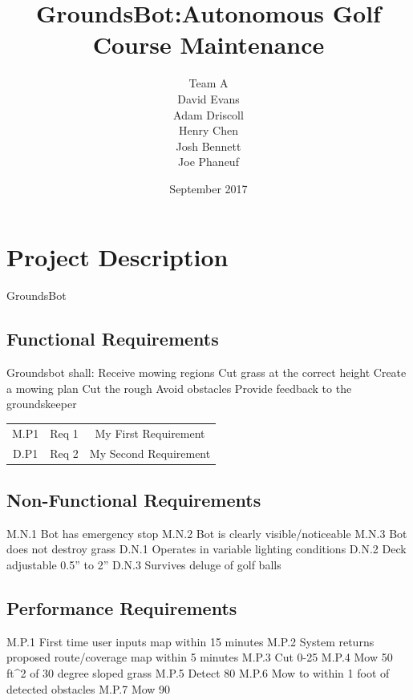 \documentclass{article}
\begin{document}
\title{GroundsBot:Autonomous Golf Course Maintenance}
\date{September 2017}
\author{Team A        \\ David Evans \\
        Adam Driscoll \\ Henry Chen  \\
        Josh Bennett  \\ Joe Phaneuf \\ }
\maketitle
\newpage

\tableofcontents
\newpage

\section{Project Description}
GroundsBot \\
\subsection{Functional Requirements}
Groundsbot shall:
  Receive mowing regions
  Cut grass at the correct height
  Create a mowing plan
  Cut the rough 
  Avoid obstacles
  Provide feedback to the groundskeeper
\begin{center}
\begin{tabular}{ |c|c|c| }
  \hline
    M.P1 & Req 1 & My First Requirement \\
    D.P1 & Req 2 & My Second Requirement \\
  \hline
\end{tabular}
\end{center}

\subsection{Non-Functional Requirements}
M.N.1 Bot has emergency stop
M.N.2 Bot is clearly visible/noticeable
M.N.3 Bot does not destroy grass
D.N.1 Operates in variable lighting conditions
D.N.2 Deck adjustable 0.5” to 2”
D.N.3 Survives deluge of golf balls


\subsection{Performance Requirements}
M.P.1 First time user inputs map within 15 minutes
M.P.2 System returns proposed route/coverage map within 5 minutes
M.P.3 Cut 0-25%
M.P.4 Mow 50 ft^2 of 30 degree sloped grass
M.P.5 Detect 80%
M.P.6 Mow to within 1 foot of detected obstacles
M.P.7 Mow 90%
\end{document}
